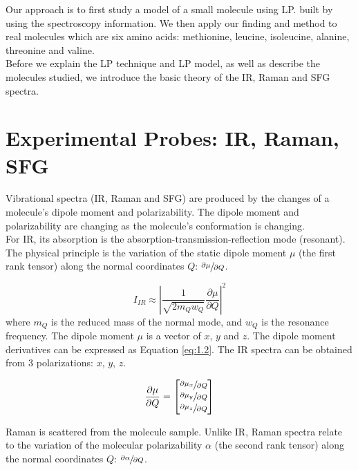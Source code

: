 Our approach is to first study a model of a small molecule using LP. built by using the spectroscopy information. We then apply our finding and method to real molecules which are six amino acids: methionine, leucine, isoleucine, alanine, threonine and valine.\\

Before we explain the LP technique and LP model, as well as describe the molecules studied, we introduce the basic theory of  the IR, Raman and SFG spectra.\\

\section{Experimental Probes: IR, Raman, SFG}
Vibrational spectra (IR, Raman and SFG) are produced by the changes of a molecule's dipole moment and polarizability. The dipole moment and polarizability are changing as the molecule's conformation is changing. \\

For IR, its absorption is the absorption-transmission-reflection mode (resonant). The physical principle is the variation of the static dipole moment $\mu$ (the first rank tensor) along the normal coordinates $Q$: $\sfrac{\partial\mu}{\partial Q}$. 

\begin{equation} \label{eq:1.1}
I_{IR} \approx \left| \frac{1}{\sqrt{2m_{Q}w_{Q}}} \frac{\partial\mu}{\partial Q} \right|^{2}
\end{equation}
where $m_{Q}$ is the reduced mass of the normal mode, and $w_{Q}$ is the resonance frequency. The dipole moment $\mu$ is a vector of $x$, $y$ and $z$. The dipole moment derivatives can be expressed as Equation \ref{eq:1.2}. The IR spectra can be obtained from 3 polarizations: $x$, $y$, $z$. 

\begin{equation} \label{eq:1.2}
\frac{\partial\mu}{\partial Q} = \begin{bmatrix}
									\sfrac{\partial\mu_{x}}{\partial Q} \\
									\sfrac{\partial\mu_{y}}{\partial Q} \\
									\sfrac{\partial\mu_{z}}{\partial Q}
								  \end{bmatrix}
\end{equation}

Raman is scattered from the molecule sample. Unlike IR, Raman spectra relate to the variation of the molecular polarizability $\alpha$ (the second rank tensor) along the normal coordinates $Q$: $\sfrac{\partial\alpha}{\partial Q}$. 

